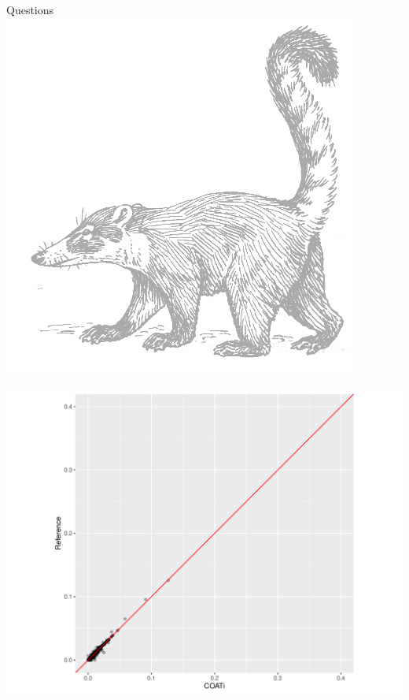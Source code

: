 \documentclass[aspectratio=169,font=14pt]{beamer}
\begin{document}
\begin{frame}{Questions} %
\includegraphics[center]{images/coati_psf_light.jpg}
\end{frame} %


\begin{frame}[noframenumbering] %
\centering
\includegraphics[height = \textheight]{defense/suppl/COATi_ref_distance.png}
\end{frame} %
\end{document}
